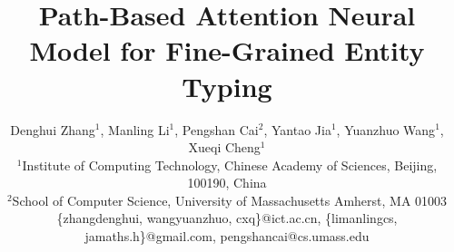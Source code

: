 \documentclass[letterpaper]{article} %
\begin{document}
%
\title{Path-Based Attention Neural Model for Fine-Grained Entity Typing}
\author{Denghui Zhang$^{1}$, Manling Li$^{1}$, Pengshan Cai$^{2}$, Yantao Jia$^{1}$, Yuanzhuo Wang$^{1}$, Xueqi Cheng$^{1}$\\
$^{1}$Institute of Computing Technology, Chinese Academy of Sciences, Beijing, 100190, China\\
$^{2}$School of Computer Science, University of Massachusetts Amherst, MA 01003\\
\{zhangdenghui, wangyuanzhuo, cxq\}@ict.ac.cn, \{limanlingcs, jamaths.h\}@gmail.com, pengshancai@cs.umass.edu\\
}
\maketitle
\end{document}
